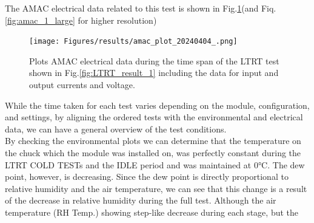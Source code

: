 The AMAC electrical data related to this test is shown in Fig.\ref{fig:amac_1}(and Fiq.\ref{fig:amac_1_large} for higher resolution)

\begin{figure}[h]
    \centering
    \texttt{[image: Figures/results/amac\_plot\_20240404\_.png]}
    \caption{Plots AMAC electrical data during the time span of the LTRT test shown in Fig.\ref{fig:LTRT_result_1} including the data for input and output currents and voltage.}
    \label{fig:amac_1}
\end{figure}

While the time taken for each test varies depending on the module, configuration, and settings, by aligning the ordered tests with the environmental and electrical data, we can have a general overview of the test conditions. \\
By checking the environmental plots we can determine that the temperature on the chuck which the module was installed on, was perfectly constant during the LTRT COLD TESTs and the IDLE period and was maintained at $0\si{\celsius}$. The dew point, however, is decreasing. Since the dew point is directly proportional to relative humidity and the air temperature, we can see that this change is a result of the decrease in relative humidity during the full test. Although the air temperature (RH Temp.) showing step-like decrease during each stage, but the  